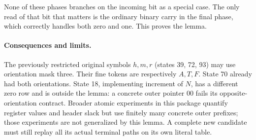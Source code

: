 None of these phases branches on the incoming bit as a special case. The
only read of that bit that matters is the ordinary binary carry in the final
phase, which correctly handles both zero and one. This proves the lemma.

\paragraph{Consequences and limits.}
The previously restricted original symbols $h,m,r$ (states 39, 72, 93)
may use orientation mask three. Their fine tokens are respectively
$A,T,F$. State 70 already had both orientations. State 18, implementing
increment of $N$, has a different zero row and is outside the lemma: a
concrete outer pointer $00$ fails its opposite-orientation contract.
Broader atomic experiments in this package quantify register values and
header slack but use finitely many concrete outer prefixes; those
experiments are not generalized by this lemma. A complete new candidate
must still replay all its actual terminal paths on its own literal table.
